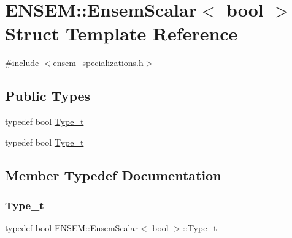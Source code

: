 \hypertarget{structENSEM_1_1EnsemScalar_3_01bool_01_4}{}\section{E\+N\+S\+EM\+:\+:Ensem\+Scalar$<$ bool $>$ Struct Template Reference}
\label{structENSEM_1_1EnsemScalar_3_01bool_01_4}


{\ttfamily \#include $<$ensem\+\_\+specializations.\+h$>$}

\subsection*{Public Types}
\begin{DoxyCompactItemize}
\item 
typedef bool \mbox{\hyperlink{structENSEM_1_1EnsemScalar_3_01bool_01_4_a577829e3cf981727768117428436ac89}{Type\+\_\+t}}
\item 
typedef bool \mbox{\hyperlink{structENSEM_1_1EnsemScalar_3_01bool_01_4_a577829e3cf981727768117428436ac89}{Type\+\_\+t}}
\end{DoxyCompactItemize}


\subsection{Member Typedef Documentation}
\mbox{\label{structENSEM_1_1EnsemScalar_3_01bool_01_4_a577829e3cf981727768117428436ac89}} 
\subsubsection{\texorpdfstring{Type\_t}{Type\_t}\hspace{0.1cm}{\footnotesize\ttfamily [1/2]}}
{\footnotesize\ttfamily typedef bool \mbox{\hyperlink{structENSEM_1_1EnsemScalar}{E\+N\+S\+E\+M\+::\+Ensem\+Scalar}}$<$ bool $>$\+::\mbox{\hyperlink{structENSEM_1_1EnsemScalar_3_01bool_01_4_a577829e3cf981727768117428436ac89}{Type\+\_\+t}}}

\mbox{\label{structENSEM_1_1EnsemScalar_3_01bool_01_4_a577829e3cf981727768117428436ac89}} 
